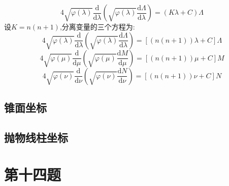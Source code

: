 \documentclass[a4paper]{ctexart}
\begin{document}
\[
4 \sqrt{\varphi(\lambda)} \frac{\mathrm{d}}{\mathrm{d} \lambda}\left(\sqrt{\varphi(\lambda)} \frac{\mathrm{d} \Lambda}{\mathrm{d} \lambda}\right)=(K \lambda+C) \Lambda
\]
设$K=n(n+1)$,分离变量的三个方程为:
$$
4\sqrt{\varphi \left( \lambda \right)}\frac{\text{d}}{\text{d}\lambda}\left( \sqrt{\varphi \left( \lambda \right)}\frac{\text{d}\Lambda}{\text{d}\lambda} \right) =\left[ \left( n\left( n+1 \right) \right) \lambda +C \right] \Lambda 
$$
$$
4\sqrt{\varphi \left( \mu \right)}\frac{\text{d}}{\text{d}\mu}\left( \sqrt{\varphi \left( \mu \right)}\frac{\text{d}M}{\text{d}\mu} \right) =\left[ \left( n\left( n+1 \right) \right) \mu +C \right] M
$$
$$
4\sqrt{\varphi \left( \nu \right)}\frac{\text{d}}{\text{d}\nu}\left( \sqrt{\varphi \left( \nu \right)}\frac{\text{d}N}{\text{d}\nu} \right) =\left[ \left( n\left( n+1 \right) \right) \nu +C \right] N
$$
\subsection{锥面坐标}
\subsection{抛物线柱坐标}
\section{第十四题}
\end{document}
